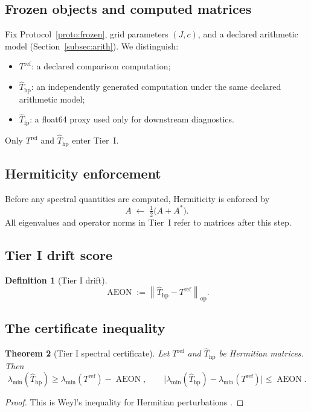 \documentclass[12pt,reqno]{amsart}
\numberwithin{equation}{section}
\newtheorem{theorem}{Theorem}[section]
\theoremstyle{definition}
\newtheorem{definition}[theorem]{Definition}
\theoremstyle{remark}
\newcommand{\opnorm}[1]{\left\|#1\right\|_{\mathrm{op}}}
\DeclareMathOperator{\AEON}{AEON}
\begin{document}
\subsection{Frozen objects and computed matrices}
Fix Protocol~\ref{proto:frozen}, grid parameters $(J,c)$, and a declared arithmetic
model (Section~\ref{subsec:arith}). We distinguish:
\begin{itemize}
\item $T^{\mathrm{ref}}$: a declared comparison computation;
\item $\widehat T_{\mathrm{hp}}$: an independently generated computation under the
same declared arithmetic model;
\item $\widehat T_{\mathrm{fp}}$: a float64 proxy used only for downstream diagnostics.
\end{itemize}
Only $T^{\mathrm{ref}}$ and $\widehat T_{\mathrm{hp}}$ enter Tier~I.

\subsection{Hermiticity enforcement}
\label{subsec:herm}
Before any spectral quantities are computed, Hermiticity is enforced by
\[
A \;\longleftarrow\; \tfrac12\bigl(A+A^\ast\bigr).
\]
All eigenvalues and operator norms in Tier~I refer to matrices after this step.

\subsection{Tier I drift score}
\begin{definition}[Tier I drift]
\label{def:aeon}
\[
\AEON := \opnorm{\widehat T_{\mathrm{hp}} - T^{\mathrm{ref}}}.
\]
\end{definition}

\subsection{The certificate inequality}
\begin{theorem}[Tier I spectral certificate]
\label{thm:tier1}
Let $T^{\mathrm{ref}}$ and $\widehat T_{\mathrm{hp}}$ be Hermitian matrices. Then
\[
\lambda_{\min}(\widehat T_{\mathrm{hp}})
\ge
\lambda_{\min}(T^{\mathrm{ref}}) - \AEON,
\qquad
\bigl|\lambda_{\min}(\widehat T_{\mathrm{hp}})-\lambda_{\min}(T^{\mathrm{ref}})\bigr|
\le \AEON.
\]
\end{theorem}

\begin{proof}
This is Weyl's inequality for Hermitian perturbations
\cite[Theorem~4.3.1]{HornJohnson}.
\end{proof}
\end{document}
